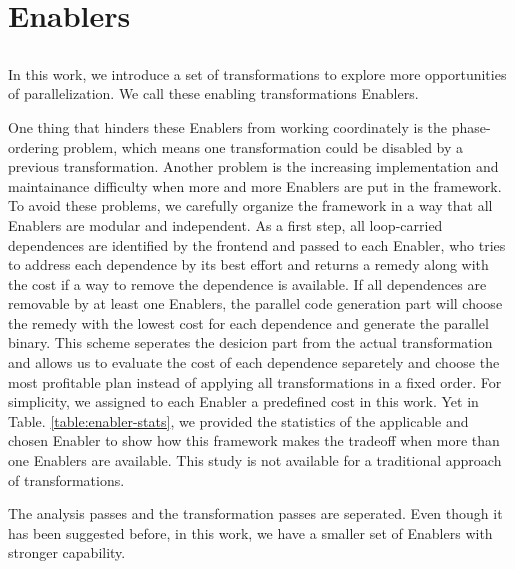 \section{Enablers}
\label{sec:enables}


\subsection{}




In this work, we introduce a set of transformations to explore more
opportunities of parallelization. We call these enabling transformations
Enablers.


One thing that hinders these Enablers from working coordinately is
the phase-ordering problem, which means one transformation could be disabled
by a previous transformation. Another problem is the increasing
implementation and maintainance difficulty when more and more Enablers are
put in the framework. To avoid these problems, we carefully organize the
framework in a way that all Enablers are modular and independent. As a first
step, all loop-carried dependences are identified by the frontend and passed
to each Enabler, who tries to address each dependence by its best effort and
returns a remedy along with the cost if a way to remove the dependence is
available. If all dependences are removable by at least one Enablers, the
parallel code generation part will choose the remedy with the lowest cost
for each dependence and generate the parallel binary. This scheme seperates
the desicion part from the actual transformation and allows us to evaluate
the cost of each dependence separetely and choose the most profitable plan
instead of applying all transformations in a fixed order. For simplicity, we
assigned to each Enabler a predefined cost in this work. Yet in Table.
\ref{table:enabler-stats}, we provided the statistics of the applicable and
chosen Enabler to show how this framework makes the tradeoff when more than
one Enablers are available. This study is not available for a traditional
approach of transformations.

The analysis passes and the transformation passes are seperated. Even though
it has been suggested before, in this work, we have a smaller set of
Enablers with stronger capability.

